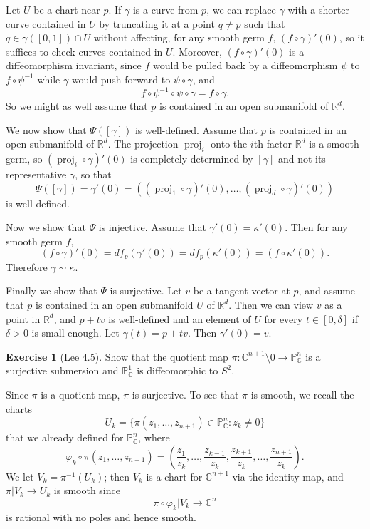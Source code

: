 \documentclass[10pt]{article}
\newcommand{\RR}{\mathbb{R}}
\newcommand{\CC}{\mathbb{C}}
\newcommand{\PP}{\mathbb P}
\DeclareMathOperator{\proj}{proj}
\theoremstyle{definition}
\newtheorem{exer}{Exercise}
\begin{document}
Let $U$ be a chart near $p$. If $\gamma$ is a curve from $p$, we can replace $\gamma$ with a shorter curve contained in $U$ by truncating it at a point $q \neq p$ such that $q \in \gamma([0, 1]) \cap U$ without affecting, for any smooth germ $f$, $(f \circ \gamma)'(0)$, so it suffices to check curves contained in $U$.
Moreover, $(f \circ \gamma)'(0)$ is a diffeomorphism invariant, since $f$ would be pulled back by a diffeomorphism $\psi$ to $f \circ \psi^{-1}$ while $\gamma$ would push forward to $\psi \circ \gamma$, and
$$f \circ \psi^{-1} \circ \psi \circ \gamma = f \circ \gamma.$$
So we might as well assume that $p$ is contained in an open submanifold of $\RR^d$.

We now show that $\Psi([\gamma])$ is well-defined.
Assume that $p$ is contained in an open submanifold of $\RR^d$.
The projection $\proj_i$ onto the $i$th factor $\RR^d$ is a smooth germ, so $(\proj_i \circ \gamma)'(0)$ is completely determined by $[\gamma]$ and not its representative $\gamma$, so that
$$\Psi([\gamma]) = \gamma'(0) = ((\proj_1 \circ \gamma)'(0), \dots, (\proj_d \circ \gamma)'(0))$$
is well-defined.

Now we show that $\Psi$ is injective. Assume that $\gamma'(0) = \kappa'(0)$. Then for any smooth germ $f$,
$$(f \circ \gamma)'(0) = df_p(\gamma'(0)) = df_p(\kappa'(0)) = (f \circ \kappa'(0)).$$
Therefore $\gamma \sim \kappa$.

Finally we show that $\Psi$ is surjective. Let $v$ be a tangent vector at $p$, and assume that $p$ is contained in an open submanifold $U$ of $\RR^d$.
Then we can view $v$ as a point in $\RR^d$, and $p + tv$ is well-defined and an element of $U$ for every $t \in [0, \delta]$ if $\delta > 0$ is small enough.
Let $\gamma(t) = p + tv$. Then $\gamma'(0) = v$.

\begin{exer}[Lee 4.5]
Show that the quotient map $\pi: \CC^{n+1}\setminus 0 \to \PP^n_\CC$ is a surjective submersion and $\PP_\CC^1$ is diffeomorphic to $S^2$.
\end{exer}

Since $\pi$ is a quotient map, $\pi$ is surjective.
To see that $\pi$ is smooth, we recall the charts
$$U_k = \{\pi(z_1, \dots, z_{n+1}) \in \PP_\CC^n: z_k \neq 0\}$$
that we already defined for $\PP^n_\CC$, where
$$\varphi_k \circ \pi(z_1, \dots, z_{n+1}) = \left(\frac{z_1}{z_k}, \dots, \frac{z_{k-1}}{z_k}, \frac{z_{k+1}}{z_k}, \dots, \frac{z_{n+1}}{z_k}\right).$$
We let $V_k = \pi^{-1}(U_k)$; then $V_k$ is a chart for $\CC^{n+1}$ via the identity map, and $\pi|V_k \to U_k$ is smooth since
$$\pi \circ \varphi_k|V_k \to \CC^n$$
is rational with no poles and hence smooth.
\end{document}
